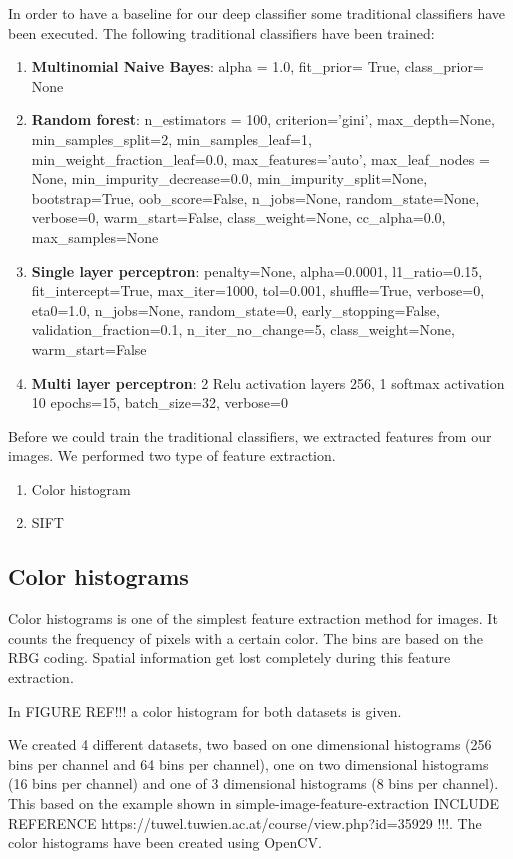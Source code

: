 \documentclass[11pt]{article}
\begin{document}
In order to have a baseline for our deep classifier some traditional classifiers have been executed. The following traditional classifiers have been trained:
\begin{enumerate}
\item{\textbf{Multinomial Naive Bayes}: alpha = 1.0, fit\_prior= True, class\_prior= None }
\item{\textbf{Random forest}: n\_estimators = 100, criterion='gini', max\_depth=None, min\_samples\_split=2, min\_samples\_leaf=1, min\_weight\_fraction\_leaf=0.0, max\_features='auto', max\_leaf\_nodes = None, min\_impurity\_decrease=0.0, min\_impurity\_split=None, bootstrap=True, oob\_score=False, n\_jobs=None, random\_state=None, verbose=0, warm\_start=False, class\_weight=None, cc\_alpha=0.0, max\_samples=None}
\item{\textbf{Single layer perceptron}:  penalty=None, alpha=0.0001, l1\_ratio=0.15, fit\_intercept=True, max\_iter=1000, tol=0.001, shuffle=True, verbose=0, eta0=1.0, n\_jobs=None, random\_state=0, early\_stopping=False, validation\_fraction=0.1, n\_iter\_no\_change=5, class\_weight=None, warm\_start=False}
\item{\textbf{Multi layer perceptron}: 2 Relu activation layers 256, 1 softmax activation 10  epochs=15, batch\_size=32, verbose=0}

\end{enumerate}

Before we could train the traditional classifiers, we extracted features from our images. We performed two type of feature extraction. 

\begin{enumerate}
\item{Color histogram}
\item{SIFT}
\end{enumerate}

\subsection{Color histograms}
Color histograms is one of the simplest feature extraction method for images. It counts the frequency of pixels with a certain color. The bins are based on the RBG coding. Spatial information get lost completely during this feature extraction.

In FIGURE REF!!! a color histogram for both datasets is given.

We created 4 different datasets, two based on one dimensional histograms (256 bins per channel and 64 bins per channel), one on two dimensional histograms (16 bins per channel) and one of 3 dimensional histograms (8 bins per channel). This based on the example shown in simple-image-feature-extraction INCLUDE REFERENCE https://tuwel.tuwien.ac.at/course/view.php?id=35929 !!!. The color histograms have been created using OpenCV. 
\end{document}
